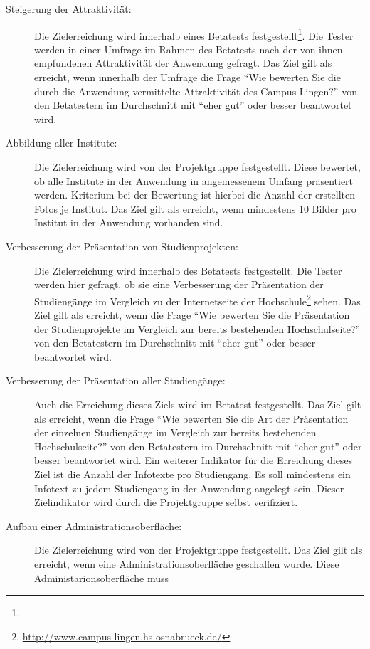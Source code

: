 \begin{description}
	\item[Steigerung der Attraktivität:] Die Zielerreichung wird innerhalb eines
	Betatests festgestellt\footnote{
	}. Die Tester werden in einer Umfrage im Rahmen des Betatests nach der von
	ihnen empfundenen Attraktivität der Anwendung gefragt. Das Ziel gilt als
	erreicht, wenn innerhalb der Umfrage die Frage "`Wie bewerten Sie die durch
	die Anwendung vermittelte Attraktivität des Campus Lingen?"' von den
	Betatestern im Durchschnitt mit "`eher gut"' oder besser beantwortet wird.
	\item[Abbildung aller Institute:] Die Zielerreichung wird von der Projektgruppe
	festgestellt. Diese bewertet, ob alle Institute in der Anwendung in
	angemessenem Umfang präsentiert werden. Kriterium bei der Bewertung ist hierbei
	die Anzahl der erstellten Fotos je Institut. Das Ziel gilt als erreicht, wenn
	mindestens 10 Bilder pro Institut in der Anwendung vorhanden sind.
	\item[Verbesserung der Präsentation von Studienprojekten:] Die Zielerreichung
	wird innerhalb des Betatests festgestellt. Die Tester werden hier gefragt,
	ob sie eine Verbesserung der Präsentation der Studiengänge im Vergleich zu der
	Internetseite der
	Hochschule\footnote{\url{http://www.campus-lingen.hs-osnabrueck.de/}} sehen.
	Das Ziel gilt als erreicht, wenn die Frage "`Wie bewerten Sie die Präsentation
	der Studienprojekte im Vergleich zur bereits bestehenden Hochschulseite?"' von
	den Betatestern im Durchschnitt mit "`eher gut"' oder besser beantwortet wird.
	\item[Verbesserung der Präsentation aller Studiengänge:] Auch die Erreichung
	dieses Ziels wird im Betatest festgestellt. Das Ziel gilt als erreicht, wenn
	die Frage "`Wie bewerten Sie die Art der Präsentation der einzelnen
	Studiengänge im Vergleich zur bereits bestehenden Hochschulseite?"' von den
	Betatestern im Durchschnitt mit "`eher gut"' oder besser beantwortet wird. Ein
	weiterer Indikator für die Erreichung dieses Ziel ist die Anzahl der Infotexte
	pro Studiengang. Es soll mindestens ein Infotext zu jedem Studiengang in der
	Anwendung angelegt sein. Dieser Zielindikator wird durch die Projektgruppe
	selbst verifiziert.
	\item[Aufbau einer Administrationsoberfläche:] Die Zielerreichung wird von der
	Projektgruppe festgestellt. Das Ziel gilt als erreicht, wenn eine
	Administrationsoberfläche geschaffen wurde. Diese Administarionsoberfläche muss

\end{description}
